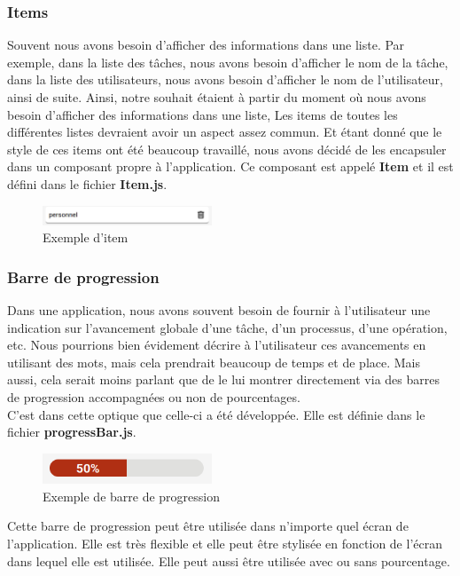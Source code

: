 \documentclass[12pt]{article}
\begin{document}
        \subsubsection{Items}\label{subsubsec:items}
        Souvent nous avons besoin d'afficher des informations dans une liste. Par exemple, dans la liste des tâches, nous avons besoin
        d'afficher le nom de la tâche, dans la liste des utilisateurs, nous avons besoin d'afficher le nom de l'utilisateur, ainsi
        de suite. Ainsi, notre souhait étaient à partir du moment où nous avons besoin d'afficher des informations dans une liste,
        Les items de toutes les différentes listes devraient avoir un aspect assez commun. Et étant donné que le style de ces items
        ont été beaucoup travaillé, nous avons décidé de les encapsuler dans un composant propre à l'application. Ce composant est appelé
        \textbf{Item} et il est défini dans le fichier \textbf{Item.js}.\\
        \begin{figure}[H]
            \centering
            \includegraphics[width=0.45\textwidth]{images/item}
            \caption{Exemple d'item}
            \label{fig:item}
        \end{figure}


        \subsubsection{Barre de progression}\label{subsubsec:barre-de-progression}
        Dans une application, nous avons souvent besoin de fournir à l'utilisateur une indication sur l'avancement globale
        d'une tâche, d'un processus, d'une opération, etc. Nous pourrions bien évidement décrire à l'utilisateur ces
        avancements en utilisant des mots, mais cela prendrait beaucoup de temps et de place. Mais aussi, cela serait moins
        parlant que de le lui montrer directement via des barres de progression accompagnées ou non de pourcentages.\\
        C'est dans cette optique que celle-ci a été développée. Elle est définie dans le fichier \textbf{progressBar.js}.
        \begin{figure}[H]
            \centering
            \includegraphics[width=0.45\textwidth]{images/progress-bar}
            \caption{Exemple de barre de progression}
            \label{fig:progress-bar}
        \end{figure}
        Cette barre de progression peut être utilisée dans n'importe quel écran de l'application. Elle est très flexible et
        elle peut être stylisée en fonction de l'écran dans lequel elle est utilisée. Elle peut aussi être utilisée avec ou sans
        pourcentage.\\
\end{document}
